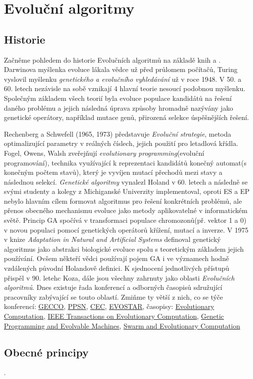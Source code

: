 \chapter{Evoluční algoritmy}
\section{Historie}
Začněme pohledem do historie Evolučních algoritmů na základě knih \citep{MitchellBook} a \citep{eibenIntro}. Darwinova myšlenka evoluce lákala vědce už před průlomem počítačů, Turing vyslovil myšlenku \textit{genetického a evolučního vyhledávání} už v roce 1948. V 50. a 60. letech nezávisle na sobě vznikají 4 hlavní teorie nesoucí podobnou myšlenku. Společným základem všech teorií byla evoluce populace kandidátů na řešení daného problému a jejich následná úprava způsoby hromadně nazývány jako genetické operátory, například mutace genů, přirozená selekce úspěšnějších řešení. \par 
Rechenberg a Schwefell (1965, 1973) představuje \textit{Evoluční strategie}, metoda optimalizující parametry v reálných číslech, jejich použití pro letadlová křídla. Fogel, Owens, Walsh zveřejňují \textit{evolutionary programming}(evoluční programování), technika využívající k reprezentaci kandidátů konečný automat(s konečným počtem stavů), který je vyvíjen mutací přechodů mezi stavy a následnou selekcí. \textit{Genetické algoritmy} vynalezl Holand v 60. letech a následně se svými studenty a kolegy z Michiganské Univerzity implementoval, oproti ES a EP nebylo hlavním cílem formovat algoritmus pro řešení konkrétních problémů, ale přenos obecného mechanismu evoluce jako metody aplikovatelné v informatickém světě. Princip GA spočívá v transformaci populace chromozonů(př. vektor 1 a 0) v novou populaci pomocí genetických operátorů křížení, mutací a inverze. V 1975 v knize \textit{Adaptation in Natural and  Artificial Systems} \citep{HolandBook} definoval genetický algoritmus jako abstrakci biologické evoluce spolu s teoretickým základem jejich používání. Ovšem někteří vědci používají pojem GA i ve významech hodně vzdálených původní Holandově definici. K sjednocení jednotlivých přístupů přispěl v 90. letehc Koza, dále jsou všechny zahrnuty jako oblasti \textit{Evolučních algoritmů}. Dnes existuje řada konferencí a odborných časopisů sdružující pracovníky zabývající se touto oblastí. Zmiňme ty větší z nich, co se týče konferencí: 
\href{http://gecco-2017.sigevo.org/index.html/HomePage}{GECCO}, \href{http://www.ppsn2016.org/conference}{PPSN}, 
\href{http://www.cec2017.org/}{CEC}, 
\href{http://www.evostar.org/2018/}{EVOSTAR}, 
časopisy: 
\href{http://www.mitpressjournals.org/loi/evco}{Evolutionary Computation}, 
\href{http://ieeexplore.ieee.org/xpl/RecentIssue.jsp?reload=true&punumber=4235}{IEEE Transactions on Evolutionary Computation}, 
\href{http://www.springer.com/computer/ai/journal/10710}{Genetic Programming and Evolvable Machines},
\href{https://www.journals.elsevier.com/swarm-and-evolutionary-computation/}{Swarm and Evolutionary Computation}
\section{Obecné principy}.